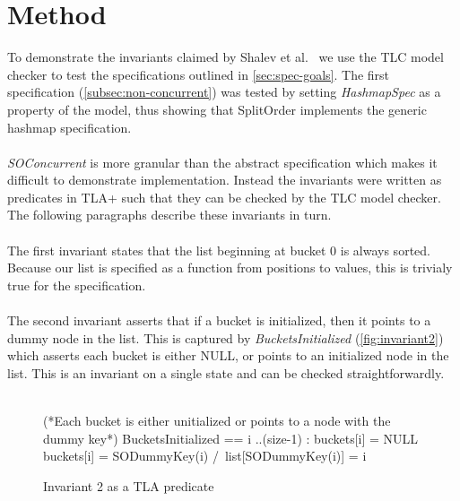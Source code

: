 \documentclass{uit-thesis}
\begin{document}
\section{Method}
To demonstrate the invariants claimed by Shalev et al.~\cite{Shalev2006} we use the TLC model checker to test the specifications outlined in \autoref{sec:spec-goals}. The first specification (\autoref{subsec:non-concurrent}) was tested by setting \textit{HashmapSpec} as a property of the model, thus showing that SplitOrder implements the generic hashmap specification.
\\\\
\textit{SOConcurrent} is more granular than the abstract specification which makes it difficult to demonstrate implementation. Instead the invariants were written as predicates in TLA+ such that they can be checked by the TLC model checker. The following paragraphs describe these invariants in turn.
\\\\
The first invariant states that the list beginning at bucket 0 is always sorted. Because our list is specified as a function from positions to values, this is trivialy true for the specification.
\\\\
The second invariant asserts that if a bucket is initialized, then it points to a dummy node in the list. This is captured by \textit{BucketsInitialized} (\autoref{fig:invariant2}) which asserts each bucket is either NULL, or points to an initialized node in the list. This is an invariant on a single state and can be checked straightforwardly.\\\\
\begin{figure}[h]
    \begin{tla}
        (*Each bucket is either unitialized or points to a node with the dummy key*)
        BucketsInitialized ==
            \A i ..(size-1) :
                \/ buckets[i] = NULL
                \/ buckets[i] = SODummyKey(i) /\ list[SODummyKey(i)] = i
    \end{tla}
\begin{tlatex}
%
%
\@xx{}%
%
%
%
\end{tlatex}
    \caption{Invariant 2 as a TLA predicate}
    \label{fig:invariant2}
\end{figure}
\end{document}

